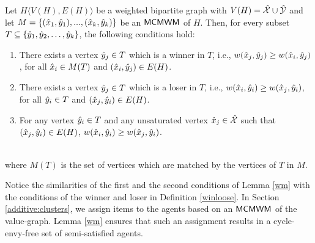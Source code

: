 \begin{lemma}
\label{wm}
Let $H\langle V(H),E(H)\rangle$ be a weighted bipartite graph with $V(H) = \hat{\mathcal{X}} \cup \hat{\mathcal{Y}}$ and let $M = \{(\hat{x}_1,\hat{y}_1),...,(\hat{x}_k,\hat{y}_k)\}$ be an $\textsf{MCMWM}$ of $H$. Then, for every subset $T \subseteq \{\hat{y}_1,\hat{y}_2, \ldots,\hat{y}_k\}$, the following conditions hold:

\begin{minipage}[t]{\linegoal}
\begin{enumerate}[leftmargin=*]
 \item There exists a vertex $\hat{y}_j \in T$ which is a winner in $T$, i.e.,  $w(\hat{x}_j,\hat{y}_{j}) \geq w(\hat{x}_i,\hat{y}_j)$, for all $\hat{x}_i \in M(T)$ and  $(\hat{x}_i,\hat{y}_j) \in E(H)$. 
\item There exists a vertex $ \hat{y}_j \in T$ which is a loser in $T$, i.e.,  $w(\hat{x}_i,\hat{y}_i)  \geq w(\hat{x}_j,\hat{y}_i) $, for all $\hat{y}_i \in T$ and $(\hat{x}_j,\hat{y}_i) \in E(H)$.
\item For any vertex $\hat{y}_i \in T$ and any unsaturated vertex $\hat{x}_j \in \hat{\mathcal{X}}$ such that $(\hat{x}_j,\hat{y}_i) \in E(H)$, $w(\hat{x}_i,\hat{y}_i) \geq w(\hat{x}_j,\hat{y}_i)$. 
\end{enumerate}
\end{minipage}
\\[6pt]
where $M(T)$ is the set of vertices which are matched by the vertices of $T$ in $M$.
\end{lemma}


Notice the similarities of the first and the second conditions of Lemma \ref{wm} with the conditions of the winner and loser in 
 Definition \ref{winloose}. In Section \ref{additive:clusters}, we assign items to the agents based on an $\textsf{MCMWM}$ of the value-graph. Lemma \ref{wm} ensures that such an assignment results in a cycle-envy-free set of semi-satisfied agents.   




 


